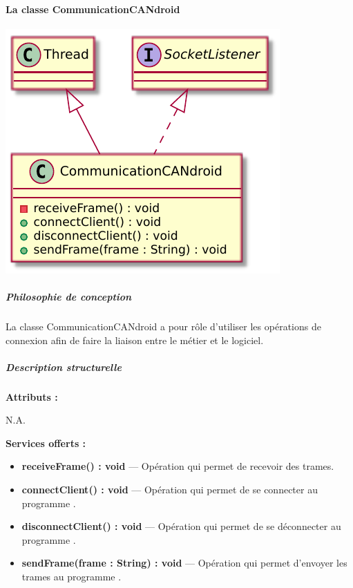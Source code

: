\paragraph{La classe CommunicationCANdroid}

\begin{minipage}
    {\linewidth}
    \centering
    \includegraphics[width=0.5\linewidth]{../schemas/Conception_detaillee/classe_communicationCANdroid.pdf}
\end{minipage}

\subparagraph{Philosophie de conception \newline} 

\medspace

La classe CommunicationCANdroid a pour rôle d'utiliser les opérations de connexion afin de faire la liaison entre le métier et le logiciel. 

\subparagraph{Description structurelle \newline}

\medspace

\textbf{Attributs :}

N.A.

\textbf{Services offerts :}

\begin{itemize}
    \item \textbf{receiveFrame() : void} --- Opération qui permet de recevoir des trames. 
    \item \textbf{connectClient() : void } --- Opération qui permet de se connecter au programme {\nomLogiciel}. 
    \item \textbf{disconnectClient() : void } --- Opération qui permet de se déconnecter au programme {\nomLogiciel}. 
    \item \textbf{sendFrame(frame : String) : void} --- Opération qui permet d'envoyer les trames au programme {\nomLogiciel}.
\end{itemize}